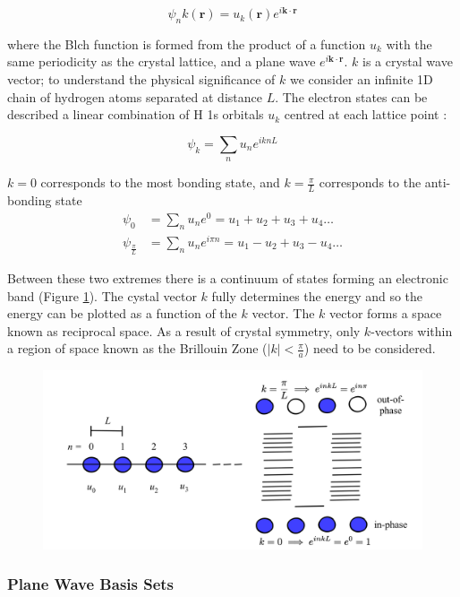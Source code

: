 $$
\psi_nk(\textbf{r}) = u_k(\textbf{r})e^{i\textbf{k}\cdot\textbf{r}}
$$

where the Blch function is formed from the product of a function $u_k$ with the same periodicity as the crystal lattice, and a plane wave $e^{i\textbf{k}\cdot\textbf{r}}$. $k$ is a crystal wave vector; to understand the physical significance of $k$ we consider an infinite 1D chain of hydrogen atoms separated at distance $L$. The electron states can be described a linear combination of H 1s orbitals $u_k$ centred at each lattice point :

$$
\psi_k = \sum_nu_ne^{iknL}
$$

$k=0$ corresponds to the most bonding state, and $k=\frac{\pi}{L}$ corresponds to the anti-bonding state
\begin{align}
\psi_0 &= \sum_nu_ne^0 = u_1 +u_2 +u_3 +u_4 \dots \\
\psi_{\frac{\pi}{L}} &= \sum_nu_ne^{i\pi n} = u_1 -u_2+u_3-u_4 \dots
\end{align}

Between these two extremes there is a continuum of states forming an electronic band (Figure \ref{bands}). The cystal vector $k$ fully determines the energy and so the energy can be plotted as a function of the $k$ vector. The $k$ vector forms a space known as reciprocal space. As a result of crystal symmetry, only $k$-vectors within a region of space known as the Brillouin Zone ($|k|<\frac{\pi}{a}$) need to be considered.

\begin{figure}[h]
\centering
  \includegraphics[width=1.0\columnwidth]{figures/ch3/bands.png}
  \caption[]{} 
  \label{bands}
\end{figure}

\subsubsection{Plane Wave Basis Sets}   %

